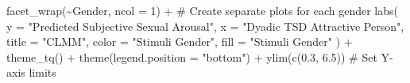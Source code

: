 \documentclass[
  bookmarksnumbered]{article}
\newenvironment{Shaded}{\begin{snugshade}}{\end{snugshade}}
\newcommand{\AttributeTok}[1]{\textcolor[rgb]{0.80,0.80,0.80}{#1}}
\newcommand{\CommentTok}[1]{\textcolor[rgb]{0.50,0.62,0.50}{#1}}
\newcommand{\DecValTok}[1]{\textcolor[rgb]{0.86,0.86,0.80}{#1}}
\newcommand{\FloatTok}[1]{\textcolor[rgb]{0.75,0.75,0.82}{#1}}
\newcommand{\FunctionTok}[1]{\textcolor[rgb]{0.94,0.94,0.56}{#1}}
\newcommand{\NormalTok}[1]{\textcolor[rgb]{0.80,0.80,0.80}{#1}}
\newcommand{\SpecialCharTok}[1]{\textcolor[rgb]{0.86,0.64,0.64}{#1}}
\newcommand{\StringTok}[1]{\textcolor[rgb]{0.80,0.58,0.58}{#1}}
\begin{document}
\begin{Shaded}
\begin{Highlighting}[]
  \FunctionTok{facet\_wrap}\NormalTok{(}\SpecialCharTok{\textasciitilde{}}\NormalTok{Gender, }\AttributeTok{ncol =} \DecValTok{1}\NormalTok{) }\SpecialCharTok{+} \CommentTok{\# Create separate plots for each gender}
  \FunctionTok{labs}\NormalTok{(}
    \AttributeTok{y =} \StringTok{"Predicted Subjective Sexual Arousal"}\NormalTok{,}
    \AttributeTok{x =} \StringTok{"Dyadic TSD Attractive Person"}\NormalTok{,}
    \AttributeTok{title =} \StringTok{"CLMM"}\NormalTok{, }\AttributeTok{color =} \StringTok{"Stimuli Gender"}\NormalTok{, }\AttributeTok{fill =} \StringTok{"Stimuli Gender"}
\NormalTok{  ) }\SpecialCharTok{+}
  \FunctionTok{theme\_tq}\NormalTok{() }\SpecialCharTok{+}
  \FunctionTok{theme}\NormalTok{(}\AttributeTok{legend.position =} \StringTok{"bottom"}\NormalTok{) }\SpecialCharTok{+}
  \FunctionTok{ylim}\NormalTok{(}\FunctionTok{c}\NormalTok{(}\FloatTok{0.3}\NormalTok{, }\FloatTok{6.5}\NormalTok{)) }\CommentTok{\# Set Y{-}axis limits}


\end{Highlighting}
\end{Shaded}
\end{document}
